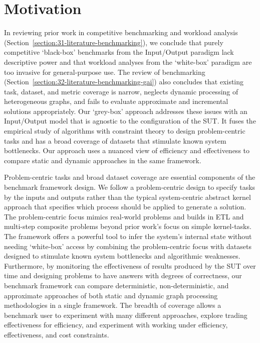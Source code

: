 \section{Motivation}
\label{section:41-GAI-Motivation}

In reviewing prior work in competitive benchmarking and workload analysis (Section~\ref{section:31-literature-benchmarking}), we conclude that purely competitive `black-box' benchmarks from the Input/Output paradigm lack descriptive power and that workload analyses from the `white-box' paradigm are too invasive for general-purpose use. 
The review of \gai benchmarking (Section~\ref{section:32-literature-benchmarking-gai}) also concludes that existing \gai task, dataset, and metric coverage is narrow, neglects dynamic processing of heterogeneous graphs, and fails to evaluate approximate and incremental solutions appropriately. 
Our `grey-box' approach addresses these issues with an Input/Output model that is agnostic to the configuration of the \ac{SUT}.
It fuses the empirical study of algorithms with constraint theory to design problem-centric tasks and has a broad coverage of datasets that stimulate known system bottlenecks.
Our approach uses a nuanced view of efficiency and effectiveness to compare static and dynamic approaches in the same framework.

Problem-centric tasks and broad dataset coverage are essential components of the \gai benchmark framework design. 
We follow a problem-centric design to specify tasks by the inputs and outputs rather than the typical system-centric abstract kernel approach that specifies which process should be applied to generate a solution.
The problem-centric focus mimics real-world problems and builds in \ac{ETL} and multi-step composite problems beyond prior work's focus on simple kernel-tasks. 
The \gai framework offers a powerful tool to infer the system's internal state without needing `white-box' access by combining the problem-centric focus with datasets designed to stimulate known system bottlenecks and algorithmic weaknesses.
Furthermore, by monitoring the effectiveness of results produced by the \ac{SUT} over time and designing problems to have answers with degrees of correctness, our benchmark framework can compare deterministic, non-deterministic, and approximate approaches of both static and dynamic graph processing methodologies in a single framework.
The breadth of coverage allows a benchmark user to experiment with many different approaches, explore trading effectiveness for efficiency, and experiment with working under efficiency, effectiveness, and cost constraints. 


